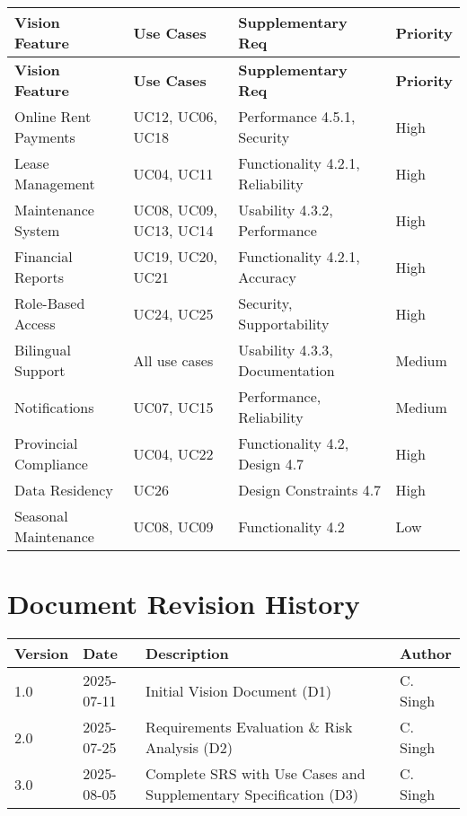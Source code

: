 \documentclass[12pt]{article}
\begin{document}
\begin{longtable}{|p{3cm}|p{4cm}|p{4cm}|p{3cm}|}
\hline
\textbf{Vision Feature} & \textbf{Use Cases} & \textbf{Supplementary Req} & \textbf{Priority} \\
\hline
\endfirsthead
\hline
\textbf{Vision Feature} & \textbf{Use Cases} & \textbf{Supplementary Req} & \textbf{Priority} \\
\hline
\endhead

Online Rent Payments & UC12, UC06, UC18 & Performance 4.5.1, Security & High \\
\hline
Lease Management & UC04, UC11 & Functionality 4.2.1, Reliability & High \\
\hline
Maintenance System & UC08, UC09, UC13, UC14 & Usability 4.3.2, Performance & High \\
\hline
Financial Reports & UC19, UC20, UC21 & Functionality 4.2.1, Accuracy & High \\
\hline
Role-Based Access & UC24, UC25 & Security, Supportability & High \\
\hline
Bilingual Support & All use cases & Usability 4.3.3, Documentation & Medium \\
\hline
Notifications & UC07, UC15 & Performance, Reliability & Medium \\
\hline
Provincial Compliance & UC04, UC22 & Functionality 4.2, Design 4.7 & High \\
\hline
Data Residency & UC26 & Design Constraints 4.7 & High \\
\hline
Seasonal Maintenance & UC08, UC09 & Functionality 4.2 & Low \\
\hline
\end{longtable}

\section{Document Revision History}

\begin{longtable}{|p{2cm}|p{2cm}|p{8cm}|p{2cm}|}
\hline
\textbf{Version} & \textbf{Date} & \textbf{Description} & \textbf{Author} \\
\hline
1.0 & 2025-07-11 & Initial Vision Document (D1) & C. Singh \\
\hline
2.0 & 2025-07-25 & Requirements Evaluation \& Risk Analysis (D2) & C. Singh \\
\hline
3.0 & 2025-08-05 & Complete SRS with Use Cases and Supplementary Specification (D3) & C. Singh \\
\hline
\end{longtable}
\end{document}

